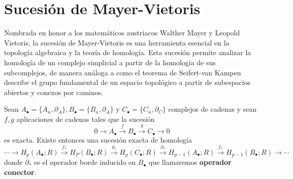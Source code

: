 \section{Sucesión de Mayer-Vietoris}
Nombrada en honor a los matemáticos austriacos Walther Mayer y Leopold Vietoris,
la sucesión de Mayer-Vietoris es una herramienta esencial en la topología algebraica
y la teoría de homología. Esta sucesión permite analizar la homología de un
complejo simplicial a partir de la homología de sus subcomplejos, de manera análoga
a como el teorema de Seifert-van Kampen describe el grupo fundamental de un espacio
topológico a partir de subespacios abiertos y conexos por caminos.
\begin{lema}
	 \label{lem:zig-zag} Sean $A_{\bullet}= \{A_{n},\partial_{A}
	\}, B_{\bullet}= \{B_{n},\partial_{A}\}$ y $C_{\bullet}= \{C_{n},\partial_{C}\}$
	complejos de cadenas y sean $f,g$ aplicaciones de cadenas tales que la sucesión
	\[
	0 \to A_{\bullet}\overset{f}{\to}B_{\bullet}\overset{g}{\to}C_{\bullet}\to 0
	\]
	es exacta. Existe entonces una sucesión exacta de homología
	\begin{equation}
		\label{eq:long-exact-hom}\cdots \to H_{p}(A_{\bullet};R) \overset{f_*}{\to}H_{P}
		(B_{\bullet};R) \overset{g_*}{\to}H_{p}(C_{\bullet};R) \overset{\partial_*}{\to}
		H_{p-1}(A_{\bullet};R) \overset{f_*}{\to}H_{p-1}(B_{\bullet};R) \to \cdots
	\end{equation}
	donde $\partial_{*}$ es el operador borde inducido en $B_{\bullet}$ que
	llamaremos \textbf{operador conector}.
\end{lema}
